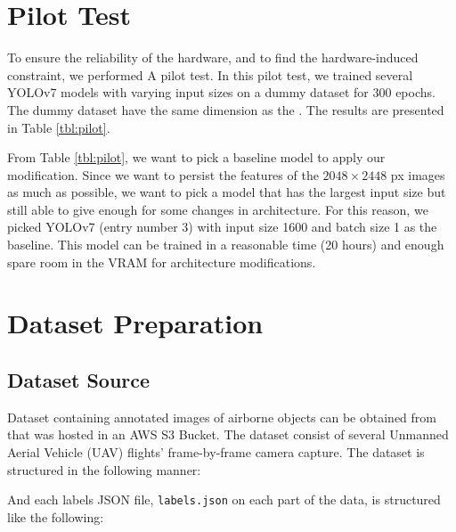 \section{Pilot Test}
To ensure the reliability of the hardware, and to find the hardware-induced constraint, we performed A
pilot test.
In this pilot test, we trained several YOLOv7 models with varying input sizes on a dummy dataset for 300 epochs.
The dummy dataset have the same dimension as the \textcite{aot_dataset}.
The results are presented in Table \ref{tbl:pilot}. 
\begin{table}[b]
  \centering
  \label{tbl:pilot}
  \vspace{-1ex}
  \begin{adjustbox}{width=\textwidth}
    
  \end{adjustbox}
\end{table}

From Table \ref{tbl:pilot}, we want to pick a baseline model to apply our modification.
Since we want to persist the features of the $2048\times 2448$ px images as much as possible, 
we want to pick a model that has the largest input size but still able to give enough for some 
changes in architecture. 
For this reason, we picked YOLOv7 (entry number 3) with input size 1600 and batch size 1 as the baseline.
This model can be trained in a reasonable time (20 hours) and enough spare room in the VRAM for architecture modifications.


\section{Dataset Preparation}
\label{section:dataset}

  \subsection{Dataset Source}
  \label{section:datasetsource}
  Dataset containing annotated images of airborne objects can be obtained from \textcite{aot_dataset}
  that was hosted in an AWS S3 Bucket.
  The dataset consist of several Unmanned Aerial Vehicle (UAV) flights' frame-by-frame camera capture.
  The dataset is structured in the following manner:

  

  And each labels JSON file, \verb|labels.json| on each part of the data, is structured like the following:

  

